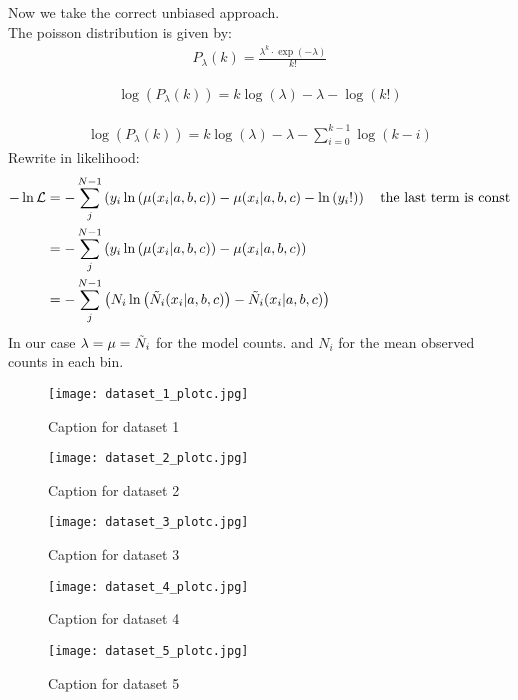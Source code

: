 Now we take the correct unbiased approach. \\
The poisson distribution is given by:
\begin{align}
    P_\lambda (k) = \frac{\lambda^k \cdot \exp(-\lambda)}{k!}
\end{align}

\begin{align}
    \log(P_\lambda (k)) = k \log(\lambda) -\lambda -\log(k!)
\end{align}

\begin{align}
    \log(P_\lambda (k)) = k \log(\lambda) -\lambda - \sum_{i=0}^{k-1} \log(k-i)
\end{align}
Rewrite in likelihood:
\begin{align}
    - \ln \mathcal{L} &= - \sum_j^{N-1} \left({y_i \ln \left({\mu(x_i|a,b,c)}\right)-\mu(x_i|a,b,c)- \ln \left({y_i!}\right)}\right) \quad \text{the last term is const}\\
    &= - \sum_j^{N-1} \left({y_i \ln \left({\mu(x_i|a,b,c)}\right)-\mu(x_i|a,b,c)}\right)\\
    &= - \sum_j^{N-1} \left({N_i \ln \left({\Tilde{N}_i(x_i|a,b,c)}\right)-\Tilde{N}_i(x_i|a,b,c)}\right)
\end{align}
In our case $\lambda = \mu = \Tilde{N}_i$ for the model counts. and $N_i$ for the mean observed counts in each bin. 

\begin{figure}[h!]
    \centering
    \texttt{[image: dataset\_1\_plotc.jpg]}
    \caption{Caption for dataset 1}
\end{figure}

\begin{figure}[h!]
    \centering
    \texttt{[image: dataset\_2\_plotc.jpg]}
    \caption{Caption for dataset 2}
\end{figure}

\begin{figure}[h!]
    \centering
    \texttt{[image: dataset\_3\_plotc.jpg]}
    \caption{Caption for dataset 3}
\end{figure}

\begin{figure}[h!]
    \centering
    \texttt{[image: dataset\_4\_plotc.jpg]}
    \caption{Caption for dataset 4}
\end{figure}

\begin{figure}[h!]
    \centering
    \texttt{[image: dataset\_5\_plotc.jpg]}
    \caption{Caption for dataset 5}
\end{figure}









